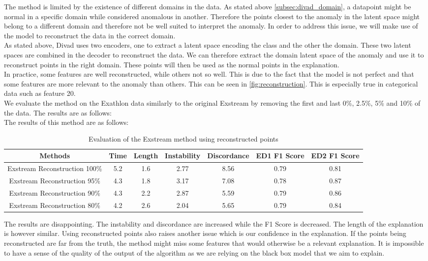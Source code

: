 \documentclass[oneside, a4paper, onecolumn, 11pt]{article}
\begin{document}
The method is limited by the existence of different domains in the data. As stated above \autoref{subsec:divad_domain}, a datapoint might be normal in a specific domain while considered anomalous in another. Therefore the points closest to the anomaly in the latent space might belong to a different domain and therefore not be well suited to interpret the anomaly. In order to address this issue, we will make use of the model to reconstruct the data in the correct domain. \\
As stated above, Divad uses two encoders, one to extract a latent space encoding the class and the other the domain. These two latent spaces are combined in the decoder to reconstruct the data. We can therefore extract the domain latent space of the anomaly and use it to reconstruct points in the right domain. These points will then be used as the normal points in the explanation.\\
In practice, some features are well reconstructed, while others not so well. This is due to the fact that the model is not perfect and that some features are more relevant to the anomaly than others. This can be seen in \autoref{fig:reconstruction}. This is especially true in categorical data such as feature 20.\\
We evaluate the method on the Exathlon data similarly to the original Exstream by removing the first and last 0\%, 2.5\%, 5\% and 10\% of the data. The results are as follows:\\
The results of this method are as follows:\\
\begin{table}[H]
  \centering
  \begin{tabular}{|c|c|c|c|c|c|c|}
      \hline
      Methods & Time & Length & Instability & Discordance & ED1 F1 Score & ED2 F1 Score\\ 
      \hline
      Exstream Reconstruction 100\% & 5.2  & 1.6  & 2.77  & 8.56 & 0.79 & 0.81  \\
      Exstream Reconstruction 95\%  & 4.3  & 1.8  & 3.17 & 7.08 & 0.78 & 0.87\\ 
      Exstream Reconstruction 90\%  & 4.3  & 2.2  & 2.87  & 5.59 & 0.79 & 0.86\\ 
      Exstream Reconstruction 80\% & 4.2 & 2.6 & 2.04 & 5.65 & 0.79 & 0.84 \\ 
      \hline
  \end{tabular}
  \caption{Evaluation of the Exstream method using reconstructed points}
  \label{tab:example}
\end{table}
The results are disappointing. The instability and discordance are increased while the F1 Score is decreased. The length of the explanation is however similar. Using reconstructed points also raises another issue which is our confidence in the explanation. If the points being reconstructed are far from the truth, the method might miss some features that would otherwise be a relevant explanation. It is impossible to have a sense of the quality of the output of the algorithm as we are relying on the black box model that we aim to explain.\\
\end{document}
